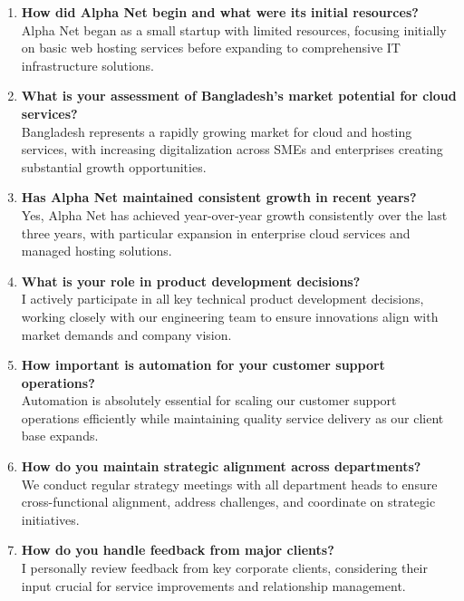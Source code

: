 \begin{enumerate}
    \item \textbf{How did Alpha Net begin and what were its initial resources?}\\
    Alpha Net began as a small startup with limited resources, focusing initially on basic web hosting services before expanding to comprehensive IT infrastructure solutions.
    
    \item \textbf{What is your assessment of Bangladesh's market potential for cloud services?}\\
    Bangladesh represents a rapidly growing market for cloud and hosting services, with increasing digitalization across SMEs and enterprises creating substantial growth opportunities.
    
    \item \textbf{Has Alpha Net maintained consistent growth in recent years?}\\
    Yes, Alpha Net has achieved year-over-year growth consistently over the last three years, with particular expansion in enterprise cloud services and managed hosting solutions.
    
    \item \textbf{What is your role in product development decisions?}\\
    I actively participate in all key technical product development decisions, working closely with our engineering team to ensure innovations align with market demands and company vision.
    
    \item \textbf{How important is automation for your customer support operations?}\\
    Automation is absolutely essential for scaling our customer support operations efficiently while maintaining quality service delivery as our client base expands.
    
    \item \textbf{How do you maintain strategic alignment across departments?}\\
    We conduct regular strategy meetings with all department heads to ensure cross-functional alignment, address challenges, and coordinate on strategic initiatives.
    
    \item \textbf{How do you handle feedback from major clients?}\\
    I personally review feedback from key corporate clients, considering their input crucial for service improvements and relationship management.
    

\end{enumerate}
